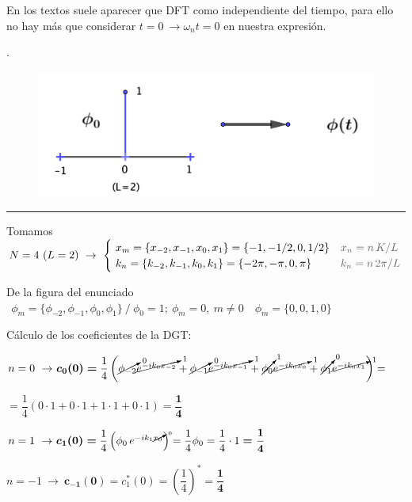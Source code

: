 En los textos suele aparecer que DFT como independiente del  tiempo, para ello no hay más que considerar $t=0 \ \to \omega_n t=0 $ en nuestra expresión.


\vspace{5mm}

\begin{example}
.	\begin{figure}[H]
	\centering
	\includegraphics[width=.6\textwidth]{imagenes/apendices-DFT14.png}
 \end{figure}
 
\rule{200pt}{0.1pt}

\vspace{5mm}
Tomamos $N=4 \ (L=2)\ \to \ \begin{cases}
 \ x_m=\{x_{-2},x_{-1},x_0,x_1\}=\{-1, -1/2,0,1/2 \}  & \textcolor{gris}{x_n=n\, K/L}\\
 \ k_n=\{k_{-2},k_{-1},k_0,k_1\}=\{-2\pi,-\pi,0,\pi\} &\textcolor{gris}{k_n=n\, 2\pi/L}
 \end{cases}$
\vspace{3mm}

De la figura del enunciado $\ \ \phi_m=\{\phi_{-2},\phi_{-1},\phi_0,\phi_1\} \ / \ \phi_0=1;\ \phi_m=0,\ m\neq 0 \quad \phi_m=\{0,0,1,0\}$

\vspace{3mm}

Cálculo de los coeficientes de la DGT:

\vspace{3mm} $n=0 \ \to \ \boldsymbol{c_0(0)=}\dfrac 1 4 \left( \cancelto{0}{\phi_{-2}} \cancelto{1}{e^{-ik_0 x_{-2}}} + \cancelto{0}{\phi_{-1}} \cancelto{1}{e^{-ik_0 x_{-1}}}  + \cancelto{1}{\phi_{0}} \cancelto{1}{e^{-ik_0 x_{0}}} + \cancelto{0}{\phi_{1}} \cancelto{1}{e^{-ik_0 x_{1}}} \right) = $

$=\dfrac 1 4 (0\cdot 1+0\cdot 1+1\cdot 1+0\cdot 1) \boldsymbol{=\dfrac 1 4}$

\vspace{3mm} $n=1 \ \to \ \boldsymbol{c_1(0)=} \dfrac 1 4 \left( \phi_0 \, e^{-ik_1 \cancelto{0}{x_0}} \right)= \dfrac 1 4 \phi_0=\dfrac 1 4 \cdot 1 \boldsymbol{=\dfrac 1 4}$

\vspace{3mm} $n={-1} \ \to \ \boldsymbol{c_{-1}(0)}=c_1^*(0)=\left(\dfrac 1 4 \right)^* \boldsymbol{=\dfrac 1 4 }$


\end{example}
